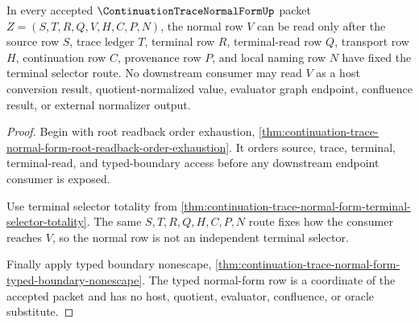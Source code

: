 \begin{theorem}
\label{thm:continuation-trace-normal-form-normal-row-precedence}
In every accepted $\ContinuationTraceNormalFormUp$ packet $Z=(S,T,R,Q,V,H,C,P,N)$, the normal row $V$ can be read only after the source row $S$, trace ledger $T$, terminal row $R$, terminal-read row $Q$, transport row $H$, continuation row $C$, provenance row $P$, and local naming row $N$ have fixed the terminal selector route. No downstream consumer may read $V$ as a host conversion result, quotient-normalized value, evaluator graph endpoint, confluence result, or external normalizer output.
\end{theorem}
\begin{proof}
Begin with root readback order exhaustion, \autoref{thm:continuation-trace-normal-form-root-readback-order-exhaustion}. It orders source, trace, terminal, terminal-read, and typed-boundary access before any downstream endpoint consumer is exposed.

Use terminal selector totality from \autoref{thm:continuation-trace-normal-form-terminal-selector-totality}. The same $S,T,R,Q,H,C,P,N$ route fixes how the consumer reaches $V$, so the normal row is not an independent terminal selector.

Finally apply typed boundary nonescape, \autoref{thm:continuation-trace-normal-form-typed-boundary-nonescape}. The typed normal-form row is a coordinate of the accepted packet and has no host, quotient, evaluator, confluence, or oracle substitute.
\end{proof}

